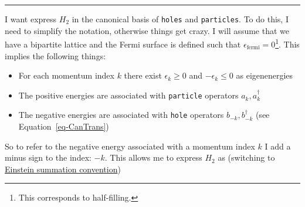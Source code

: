 \documentclass[
  letterpaper,
  DIV=11,
  numbers=noendperiod]{scrartcl}
\begin{document}
\begin{center}\rule{0.5\linewidth}{0.5pt}\end{center}

I want express \(H_2\) in the canonical basis of \texttt{holes} and
\texttt{particles}. To do this, I need to simplify the notation,
otherwise things get crazy. I will assume that we have a bipartite
lattice and the Fermi surface is defined such that
\(\epsilon_{\operatorname{fermi}}=0\)\footnote{This corresponds to
  half-filling.}. This implies the following things:

\begin{itemize}
\item
  For each momentum index \(k\) there exist \(\epsilon_k\ge 0\) and
  \(-\epsilon_k\le 0\) as eigenenergies
\item
  The positive energies are associated with \texttt{particle} operators
  \(a^{}_k,a^\dagger_k\)
\item
  The negative energies are associated with \texttt{hole} operators
  \(b^{}_{-k},b^\dagger_{-k}\) (see Equation~\ref{eq-CanTrans})
\end{itemize}

So to refer to the negative energy associated with a momentum index
\(k\) I add a minus sign to the index: \(-k\). This allows me to express
\(H_2\) as (switching to
\href{https://en.wikipedia.org/wiki/Einstein_notation}{Einstein
summation convention})
\end{document}
